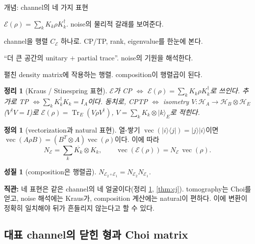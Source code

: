 \documentclass[11pt,a4paper]{article}
\newcommand{\E}{\mathcal{E}}
\newcommand{\Hcal}{\mathcal{H}}
\newcommand{\Tr}{\operatorname{Tr}}
\newcommand{\vecop}{\operatorname{vec}}
\theoremstyle{definition}
\newtheorem{definition}{정의}[section]
\theoremstyle{plain}
\newtheorem{theorem}{정리}[section]
\newtheorem{property}{성질}[section]
\theoremstyle{remark}
\begin{document}
\begin{conceptbox}{개념: channel의 네 가지 표현}
\begin{description}[leftmargin=1.5em,style=nextline]
  \item[Kraus] $\E(\rho)=\sum_k K_k\rho K_k^\dagger$. noise의 물리적 갈래를 보여준다.
  \item[Choi] channel을 행렬 $C_\E$ 하나로. CP/TP, rank, eigenvalue를 한눈에 본다.
  \item[Stinespring] ``더 큰 공간의 unitary $+$ partial trace''. noise의 기원을 해석한다.
  \item[Natural(Liouville)] 펼친 density matrix에 작용하는 행렬. composition이 행렬곱이 된다.
\end{description}
\end{conceptbox}

\begin{theorem}[Kraus / Stinespring 표현]\label{thm:kraus}
$\E$가 CP $\iff$ $\E(\rho)=\sum_k K_k\rho K_k^\dagger$로 쓰인다. 추가로 TP $\iff\sum_k K_k^\dagger K_k=I_A$이다. 동치로, CPTP $\iff$ isometry $V:\Hcal_A\to\Hcal_B\otimes\Hcal_E$($V^\dagger V=I$)로 $\E(\rho)=\Tr_E(V\rho V^\dagger)$, $V=\sum_k K_k\otimes|k\rangle_E$로 적힌다.
\end{theorem}

\begin{definition}[vectorization과 natural 표현]
열-쌓기 $\vecop(|i\rangle\langle j|)=|j\rangle|i\rangle$이면 $\vecop(A\rho B)=(B^T\otimes A)\vecop(\rho)$이다. 이에 따라
\[
N_\E=\sum_k\overline{K_k}\otimes K_k,\qquad \vecop(\E(\rho))=N_\E\,\vecop(\rho).
\]
\end{definition}

\begin{property}[composition은 행렬곱]\label{prop:compose}
$N_{\E_2\circ\E_1}=N_{\E_2}N_{\E_1}$.
\end{property}

\begin{intuitionbox}
\textbf{직관:} 네 표현은 같은 channel의 네 얼굴이다(정리 \ref{thm:kraus}, \ref{thm:cj}). tomography는 Choi를 얻고, noise 해석에는 Kraus가, composition 계산에는 natural이 편하다. 이에 변환이 정확히 일치해야 뒤가 흔들리지 않는다고 할 수 있다.
\end{intuitionbox}

\subsection{대표 channel의 닫힌 형과 Choi matrix}
\end{document}
